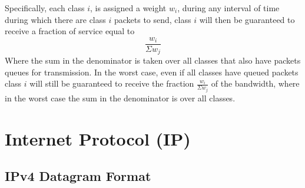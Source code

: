 \documentclass[12pt letter]{report}
\begin{document}
Specifically, each class $i$, is assigned a weight $w_i$, during any
interval of time during which there are class $i$ packets to send,
class $i$ will then be guaranteed to receive a fraction of service equal to
\[
  \displaystyle\frac{w_i}{\displaystyle\Sigma w_j}
\]
Where the sum in the denominator is taken over all classes that also
have packets queues for transmission. In the worst case, even if all
classes have queued packets class $i$ will still be guaranteed to
receive the fraction $\displaystyle\frac{w_i}{\Sigma w_j}$ of the
bandwidth, where in the worst case the sum in the denominator is over
all classes.

\chapter{Internet Protocol (IP)}

\section{IPv4 Datagram Format}
\end{document}
